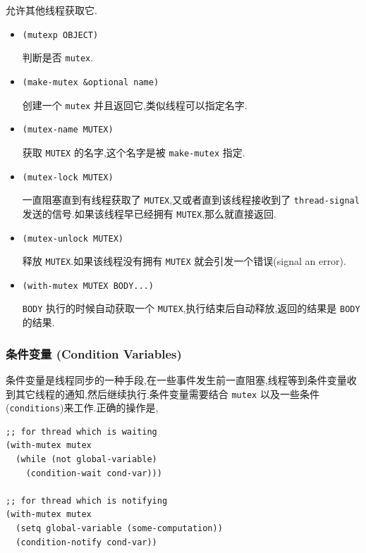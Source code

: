 \documentclass[11pt]{article}
\begin{document}
允许其他线程获取它.

\begin{itemize}
\item \texttt{(mutexp OBJECT)}

判断是否 \texttt{mutex}.

\item \texttt{(make-mutex \&optional name)}

创建一个 \texttt{mutex} 并且返回它,类似线程可以指定名字.

\item \texttt{(mutex-name MUTEX)}

获取 \texttt{MUTEX} 的名字,这个名字是被 \texttt{make-mutex} 指定.

\item \texttt{(mutex-lock MUTEX)}

一直阻塞直到有线程获取了 \texttt{MUTEX},又或者直到该线程接收到了 \texttt{thread-signal} 发送的信号.如果该线程早已经拥有 \texttt{MUTEX},那么就直接返回.

\item \texttt{(mutex-unlock MUTEX)}

释放 \texttt{MUTEX}.如果该线程没有拥有 \texttt{MUTEX} 就会引发一个错误(signal an error).

\item \texttt{(with-mutex MUTEX BODY...)}

\texttt{BODY} 执行的时候自动获取一个 \texttt{MUTEX},执行结束后自动释放,返回的结果是 \texttt{BODY} 的结果.
\end{itemize}



\subsubsection{条件变量 (Condition Variables)}
\label{sec:orgf5b5989}

条件变量是线程同步的一种手段,在一些事件发生前一直阻塞,线程等到条件变量收到其它线程的通知,然后继续执行.条件变量需要结合 \texttt{mutex} 以及一些条件(\texttt{conditions})来工作.正确的操作是,

\begin{verbatim}
;; for thread which is waiting
(with-mutex mutex
  (while (not global-variable)
    (condition-wait cond-var)))

;; for thread which is notifying
(with-mutex mutex
  (setq global-variable (some-computation))
  (condition-notify cond-var))
\end{verbatim}
\end{document}
